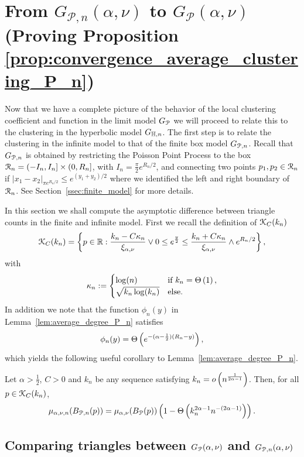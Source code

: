 \section{From $G_{\mathcal{P}, n}(\alpha, \nu)$ to $G_{\mathcal{P}}(\alpha, \nu)$ (Proving Proposition \ref{prop:convergence_average_clustering_P_n})}\label{sec:clustering_Pn_to_P}

Now that we have a complete picture of the behavior of the local clustering coefficient and function in the limit model $G_{{\mathcal P}}$ we will proceed to relate this to the clustering in the hyperbolic model $G_{\mathbb{H},n}$. The first step is to relate the clustering in the infinite model to that of the finite box model $G_{{\mathcal P}, n}$. Recall that $G_{{\mathcal P},n}$ is obtained by restricting the Poisson Point Process to the box ${\mathcal R}_n = (-I_n, I_n] \times (0, R_n]$, with $I_n = \frac{\pi}{2} e^{R_n/2}$, and connecting two points $p_1, p_2 \in {\mathcal R}_n$ if $|x_1 - x_2|_{\pi e^{R_n/2}} \le e^{(y_1 + y_2)/2}$ where we identified the left and right boundary of ${\mathcal R}_n$. See Section~\ref{ssec:finite_model} for more details. 

In this section we shall compute the asymptotic difference between triangle counts in the finite and infinite model. First we recall the definition of ${\mathcal K}_{C}(k_n)$
\[
	{\mathcal K}_C(k_n) = \left\{p \in {\ensuremath{\mathbb R}} : \frac{k_n - C \kappa_n}{\xi_{\alpha,\nu}} \vee 0 \le e^{\frac{y}{2}}
	\le \frac{k_n + C \kappa_n}{\xi_{\alpha,\nu}} \wedge e^{R_n/2} \right\},	
\]
with
\[
	\kappa_n := \begin{cases}
		\log(n) &\mbox{if } k_n = \Theta\left(1\right),\\
		\sqrt{k_n \log(k_n)} &\mbox{else.}
	\end{cases}
\]
In addition we note that the function $\phi_n(y)$ in Lemma~\ref{lem:average_degree_P_n} satisfies
\[
	\phi_n(y) = \Theta\left(e^{-(\alpha - \frac{1}{2})(R_n - y)}\right),
\]
which yields the following useful corollary to Lemma~\ref{lem:average_degree_P_n}.

\begin{corollary}\label{cor:average_degree_P_n_K}
Let $\alpha > \frac{1}{2}$, $C > 0$ and $k_n$ be any sequence satisfying $k_n = o\left(n^{\frac{1}{2\alpha - 1}}\right)$. Then, for all $p \in {\mathcal K}_{C}(k_n)$,
\[
	\mu_{\alpha,\nu ,n}(B_{{\mathcal P},n}(p)) = \mu_{\alpha,\nu}(B_{{\mathcal P}}(p))\left(1 - \Theta\left(k_n^{2\alpha - 1} n^{-(2\alpha - 1)}\right)\right).
\]
\end{corollary}


\subsection{Comparing triangles between $G_{{\mathcal P}}(\alpha,\nu)$ and $G_{{\mathcal P},n}(\alpha,\nu)$}

